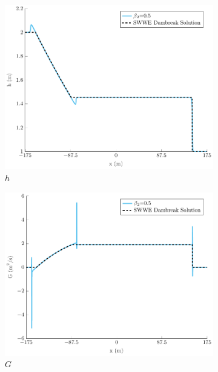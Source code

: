 \documentclass[10pt]{elsarticle}
\begin{document}
\begin{figure}
	\centering
	\begin{subfigure}{0.32\textwidth}
		\centering
		\includegraphics[width=\textwidth]{./Figures/Simulations/Study/RegSWWE/Convergence/h.pdf}
		\caption{$h$}
	\end{subfigure}
	\begin{subfigure}{0.32\textwidth}
	\centering
	\includegraphics[width=\textwidth]{./Figures/Simulations/Study/RegSWWE/Convergence/G.pdf}
	\caption{$G$}
	\end{subfigure}
	\begin{subfigure}{0.32\textwidth}
	\centering

\end{subfigure}
\end{figure}
\end{document}

